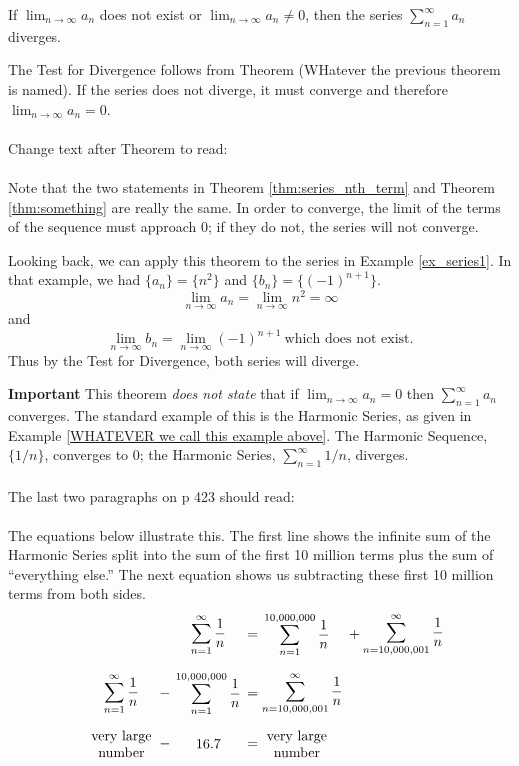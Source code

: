 \documentclass[10pt]{article}
\newcommand{\ds}{\displaystyle}
\begin{document}
		If $ \ds \lim_{n\to\infty} a_n$ does not exist or $\ds  \lim_{n\to\infty}a_n\neq0$, then the series $\ds \sum_{n=1}^\infty a_n$ diverges.

The Test for Divergence follows from Theorem {(WHatever the previous theorem is named)}. If the series does not diverge, it must converge and therefore $\ds  \lim_{n\to\infty}a_n=0$.  \\ \\

Change text after Theorem to read: \\ \\

Note that the two statements in Theorem \ref{thm:series_nth_term}%
 and Theorem \ref{thm:something} %
are really the same. In order to converge, the limit of the terms of the sequence must approach 0; if they do not, the series will not converge. 

Looking back, we can apply this theorem to the series in Example \ref{ex_series1}. In that example, we had $\{a_n\} = \{n^2\}$ and $\{b_n\} = \{(-1)^{n+1}\}$. $$ \lim_{n\to\infty} a_n=\lim_{n\to\infty} n^2=\infty$$ and  $$\lim_{n\to\infty} b_n=\lim_{n\to\infty}(-1)^{n+1}~\text{which does not exist.}$$ Thus by the Test for Divergence, both series will diverge.

\textbf{Important} This theorem \emph{does not state} that if $\ds \lim_{n\to\infty} a_n = 0$ then $\ds \sum_{n=1}^\infty  a_n $ converges. The standard example of this is the Harmonic Series, as given in Example \ref{WHATEVER we call this example above}. The Harmonic Sequence, $\{1/n\}$, converges to 0; the Harmonic Series, $\ds \sum_{n=1}^\infty 1/n$, diverges. \\ \\


The last two paragraphs on p 423 should read:\\ \\

The equations below illustrate this. The first line shows the infinite sum of the Harmonic Series split into the sum of the first 10 million terms plus the sum of ``everything else.'' The next equation shows us subtracting these first 10 million terms from both sides. 
\begin{align*}
 \parbox{50pt}{\centering$\ds\sum_{n=1}^\infty \frac1n$} &= \parbox{50pt}{\centering$\ds\sum_{n=1}^{10,000,000}\frac1n$}\quad + \parbox{50pt}{\centering$\ds\sum_{n=10,000,001}^\infty \frac1n$} \rule[-20pt]{0pt}{1pt} \\
 \parbox{50pt}{\centering$\ds\sum_{n=1}^\infty \frac1n$} - \parbox{50pt}{\centering$\ds\sum_{n=1}^{10,000,000}\frac1n$}&= \parbox{50pt}{\centering$\ds\sum_{n=10,000,001}^\infty \frac1n$} \rule[-20pt]{0pt}{1pt}\\
\parbox{50pt}{\centering	very large number} - \parbox{50pt}{\centering $16.7$} &=  \parbox{50pt}{\centering very large number}
\end{align*}													
\end{document}
